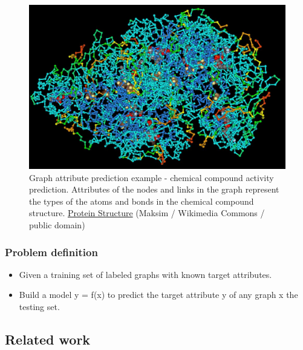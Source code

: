 \documentclass{article}
\begin{document}
\begin{figure}[H]\centering
	\includegraphics[width=\textwidth]{ProteinStructure}
	\caption{
		Graph attribute prediction example - chemical compound activity prediction.
		Attributes of the nodes and links in the graph represent
		the types of the atoms and bonds in the chemical compound structure.
		\href{https://commons.wikimedia.org/wiki/File:ProteinStructure.jpg}
		{Protein Structure}
		(Maksim / Wikimedia Commons / public domain)
	}
	\label{fig:protein}
\end{figure}

\subsubsection{Problem definition}
\begin{itemize}
	\item Given a training set of labeled graphs with known target attributes.
	\item Build a model y = f(x) to predict the target attribute y of any graph x the testing set.
\end{itemize}

\subsection{Related work}
\end{document}
